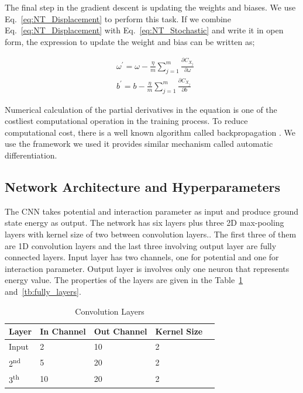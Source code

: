 \documentclass[a4paper,times,hidelinks,12pt]{article}
\begin{document}
The final step in the gradient descent is updating the weights and biases. We use Eq.~\eqref{eq:NT_Displacement} to perform this task. If we combine Eq.~\eqref{eq:NT_Displacement} with Eq.~\eqref{eq:NT_Stochastic} and write it in open form, the expression to update the weight and bias can be written as;

\begin{equation}
\label{eq:NT_weight_bias_update}
\begin{split}
& \omega^{\prime} = \omega - \frac{\eta}{m} \sum\limits_{j = 1}^{m} \frac{\partial{C_{X_j}}}{\partial{\omega}} \\
& b^{\prime} = b- \frac{\eta}{m} \sum\limits_{j = 1}^{m} \frac{\partial{C_{X_j}}}{\partial{b}}
\end{split}
\end{equation}

\noindent Numerical calculation of the partial derivatives in the equation is one of the costliest computational operation in the training process. To reduce computational cost, there is a well known algorithm called backpropagation \cite{goodfellow2016deep}. We use the framework we used it provides similar mechanism called automatic differentiation. 

\subsection{Network Architecture and Hyperparameters}

The CNN takes potential and interaction parameter as input and produce ground state energy as output. The network has six layers plus three 2D max-pooling layers with kernel size of two between convolution layers.. The first three of them are 1D convolution layers and the last three involving output layer are fully connected layers. Input layer has two channels, one for potential and one for interaction parameter. Output layer is involves only one neuron that represents energy value. The properties of the layers are given in the Table~\ref{tb:conv_layers} and~\ref{tb:fully_layers}.

\begin{table}[H]
    \centering
    \caption{Convolution Layers}
    \label{tb:conv_layers}
    \begin{tabular}{|l|l|l|l|l|} \hline
    \textbf{Layer}        & \textbf{In Channel} & \textbf{Out Channel}   & \textbf{Kernel Size}  \\ \hline
    Input                 & 2                   & 10                     & 2                     \\ \hline
    2\textsuperscript{nd} & 5                   & 20                     & 2                     \\ \hline
    3\textsuperscript{th} & 10                  & 20                     & 2                     \\ \hline
    \end{tabular}
\end{table}
\end{document}
